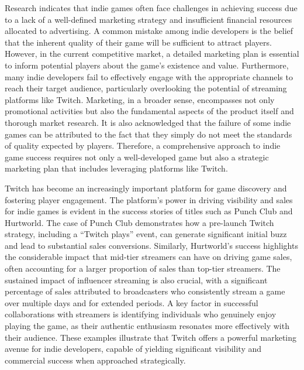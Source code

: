 \documentclass[conference]{IEEEtran}
\begin{document}
Research indicates that indie games often face challenges in achieving success due to a lack of a well-defined marketing strategy and insufficient financial resources allocated to advertising. A common mistake among indie developers is the belief that the inherent quality of their game will be sufficient to attract players. However, in the current competitive market, a detailed marketing plan is essential to inform potential players about the game's existence and value. Furthermore, many indie developers fail to effectively engage with the appropriate channels to reach their target audience, particularly overlooking the potential of streaming platforms like Twitch. Marketing, in a broader sense, encompasses not only promotional activities but also the fundamental aspects of the product itself and thorough market research. It is also acknowledged that the failure of some indie games can be attributed to the fact that they simply do not meet the standards of quality expected by players. Therefore, a comprehensive approach to indie game success requires not only a well-developed game but also a strategic marketing plan that includes leveraging platforms like Twitch.

Twitch has become an increasingly important platform for game discovery and fostering player engagement. The platform's power in driving visibility and sales for indie games is evident in the success stories of titles such as Punch Club and Hurtworld. The case of Punch Club demonstrates how a pre-launch Twitch strategy, including a ``Twitch plays'' event, can generate significant initial buzz and lead to substantial sales conversions. Similarly, Hurtworld's success highlights the considerable impact that mid-tier streamers can have on driving game sales, often accounting for a larger proportion of sales than top-tier streamers. The sustained impact of influencer streaming is also crucial, with a significant percentage of sales attributed to broadcasters who consistently stream a game over multiple days and for extended periods. A key factor in successful collaborations with streamers is identifying individuals who genuinely enjoy playing the game, as their authentic enthusiasm resonates more effectively with their audience. These examples illustrate that Twitch offers a powerful marketing avenue for indie developers, capable of yielding significant visibility and commercial success when approached strategically.
\end{document}
